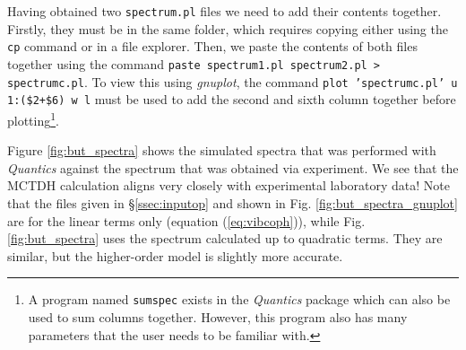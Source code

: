 \documentclass[12pt]{article}
\begin{document}
Having obtained two \texttt{spectrum.pl} files we need to add their contents together. Firstly, they must be in the same folder, which requires copying either using the \texttt{cp} command or in a file explorer. Then, we paste the contents of both files together using the command \texttt{paste spectrum1.pl spectrum2.pl > spectrumc.pl}. To view this using \textit{gnuplot}, the command \texttt{plot 'spectrumc.pl' u 1:(\$2+\$6) w l} must be used to add the second and sixth column together before plotting\footnote{A program named \texttt{sumspec} exists in the \textit{Quantics} package which can also be used to sum columns together. However, this program also has many parameters that the user needs to be familiar with.}.

Figure \ref{fig:but_spectra} shows the simulated spectra that was performed with \textit{Quantics} against the spectrum that was obtained via experiment. We see that the MCTDH calculation aligns very closely with experimental laboratory data! Note that the files given in \S\ref{ssec:inputop} and shown in Fig. \ref{fig:but_spectra_gnuplot} are for the linear terms only (equation (\ref{eq:vibcoph})), while Fig. \ref{fig:but_spectra} uses the spectrum calculated up to quadratic terms. They are similar, but the higher-order model is slightly more accurate.
\end{document}
